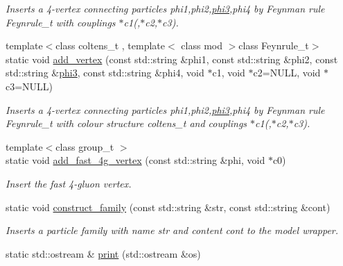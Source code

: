 \begin{DoxyCompactItemize}
\begin{DoxyCompactList}\small\item\em Inserts a 4-\/vertex connecting particles phi1,phi2,\hyperlink{a00424}{phi3},phi4 by Feynman rule Feynrule\+\_\+t with couplings $\ast$c1(,$\ast$c2,$\ast$c3). \end{DoxyCompactList}\item 
\hypertarget{a00372_aebf3e4488323bb36b01109db552b28ae}{}{\footnotesize template$<$class coltens\+\_\+t , template$<$ class mod $>$class Feynrule\+\_\+t$>$ }\\static void \hyperlink{a00372_aebf3e4488323bb36b01109db552b28ae}{add\+\_\+vertex} (const std\+::string \&phi1, const std\+::string \&phi2, const std\+::string \&\hyperlink{a00424}{phi3}, const std\+::string \&phi4, void $\ast$c1, void $\ast$c2=N\+U\+L\+L, void $\ast$c3=N\+U\+L\+L)\label{a00372_aebf3e4488323bb36b01109db552b28ae}

\begin{DoxyCompactList}\small\item\em Inserts a 4-\/vertex connecting particles phi1,phi2,\hyperlink{a00424}{phi3},phi4 by Feynman rule Feynrule\+\_\+t with colour structure coltens\+\_\+t and couplings $\ast$c1(,$\ast$c2,$\ast$c3). \end{DoxyCompactList}\item 
{\footnotesize template$<$class group\+\_\+t $>$ }\\static void \hyperlink{a00372_a1a0e098a96a98c708e8d647e147eb9fe}{add\+\_\+fast\+\_\+4g\+\_\+vertex} (const std\+::string \&phi, void $\ast$c0)
\begin{DoxyCompactList}\small\item\em Insert the fast 4-\/gluon vertex. \end{DoxyCompactList}\item 
\hypertarget{a00372_a554b309bf5636ab532074419aa98c555}{}static void \hyperlink{a00372_a554b309bf5636ab532074419aa98c555}{construct\+\_\+family} (const std\+::string \&str, const std\+::string \&cont)\label{a00372_a554b309bf5636ab532074419aa98c555}

\begin{DoxyCompactList}\small\item\em Inserts a particle family with name str and content cont to the model wrapper. \end{DoxyCompactList}\item 
\hypertarget{a00372_ab599162e170d8234213fc107d5c6427a}{}static std\+::ostream \& \hyperlink{a00372_ab599162e170d8234213fc107d5c6427a}{print} (std\+::ostream \&os)\label{a00372_ab599162e170d8234213fc107d5c6427a}


\end{DoxyCompactItemize}
